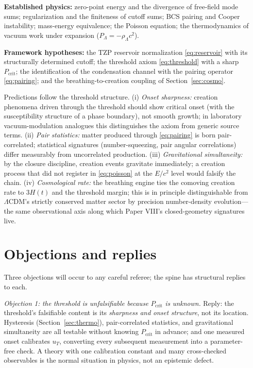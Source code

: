 \documentclass[11pt]{article}
\theoremstyle{remark}
\begin{document}
\textbf{Established physics:} zero-point energy and the divergence of free-field mode sums; regularization and the finiteness of cutoff sums; BCS pairing and Cooper instability; mass-energy equivalence; the Poisson equation; the thermodynamics of vacuum work under expansion ($P_\Lambda = -\rho_\Lambda c^2$).

\textbf{Framework hypotheses:} the TZP reservoir normalization \eqref{eq:reservoir} with its structurally determined cutoff; the threshold axiom \eqref{eq:threshold} with a sharp $P_{\mathrm{crit}}$; the identification of the condensation channel with the pairing operator \eqref{eq:pairing}; and the breathing-to-creation coupling of Section~\ref{sec:cosmo}.

Predictions follow the threshold structure. (i) \emph{Onset sharpness:} creation phenomena driven through the threshold should show critical onset (with the susceptibility structure of a phase boundary), not smooth growth; in laboratory vacuum-modulation analogues this distinguishes the axiom from generic source terms. (ii) \emph{Pair statistics:} matter produced through \eqref{eq:pairing} is born pair-correlated; statistical signatures (number-squeezing, pair angular correlations) differ measurably from uncorrelated production. (iii) \emph{Gravitational simultaneity:} by the closure discipline, creation events gravitate immediately; a creation process that did not register in \eqref{eq:poisson} at the $E/c^2$ level would falsify the chain. (iv) \emph{Cosmological rate:} the breathing engine ties the comoving creation rate to $3H(t)$ and the threshold margin; this is in principle distinguishable from $\Lambda$CDM's strictly conserved matter sector by precision number-density evolution---the same observational axis along which Paper VIII's closed-geometry signatures live.

\section{Objections and replies}
\label{sec:objections}

Three objections will occur to any careful referee; the spine has structural replies to each.

\emph{Objection 1: the threshold is unfalsifiable because $P_{\mathrm{crit}}$ is unknown.} Reply: the threshold's falsifiable content is its \emph{sharpness and onset structure}, not its location. Hysteresis (Section~\ref{sec:thermo}), pair-correlated statistics, and gravitational simultaneity are all testable without knowing $P_{\mathrm{crit}}$ in advance; and one measured onset calibrates $u_T$, converting every subsequent measurement into a parameter-free check. A theory with one calibration constant and many cross-checked observables is the normal situation in physics, not an epistemic defect.
\end{document}
